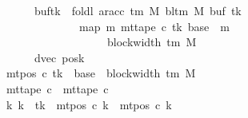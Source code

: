 \begin{isabellebody}
\ \ \ \ \ \ \ \ \ \ \ \ \ \ \ \ \ \ \ \ buf{}{\isacharparenleft}{\kern0pt}tk\ {\isacharcolon}{\kern0pt}{\isacharequal}{\kern0pt}\ foldl\ {\isacharparenleft}{\kern0pt}ar{\isacharunderscore}{\kern0pt}acc\ {\isacharparenleft}{\kern0pt}{\isasymGamma}{\isacharunderscore}{\kern0pt}tm\ M{\isacharparenright}{\kern0pt}\ {\isacharparenleft}{\kern0pt}bl{\isacharunderscore}{\kern0pt}tm\ M{\isacharparenright}{\kern0pt}{\isacharparenright}{\kern0pt}\ {\isacharparenleft}{\kern0pt}buf{}\ tk{\isacharparenright}{\kern0pt}\isanewline
\ \ \ \ \ \ \ \ \ \ \ \ \ \ \ \ \ \ \ \ \ \ \ \ \ \ \ \ {\isacharparenleft}{\kern0pt}map\ {\isacharparenleft}{\kern0pt}{\isasymlambda}m{\isachardot}{\kern0pt}\ mt{\isacharunderscore}{\kern0pt}tape\ c{\isacharprime}{\kern0pt}\ tk\ {\isacharparenleft}{\kern0pt}base\ {\isacharplus}{\kern0pt}\ m{\isacharparenright}{\kern0pt}{\isacharparenright}{\kern0pt}\isanewline
\ \ \ \ \ \ \ \ \ \ \ \ \ \ \ \ \ \ \ \ \ \ \ \ \ \ \ \ \ \ \ \ \ {\isacharbrackleft}{\kern0pt}{}{\isachardot}{\kern0pt}{\isachardot}{\kern0pt}{\isacharless}{\kern0pt}block{\isacharunderscore}{\kern0pt}width\ {\isacharparenleft}{\kern0pt}{\isasymGamma}{\isacharunderscore}{\kern0pt}tm\ M{\isacharparenright}{\kern0pt}\ {\isacharminus}{\kern0pt}\ {}{\isacharbrackright}{\kern0pt}{\isacharparenright}{\kern0pt}{\isacharparenright}{\kern0pt}{\isacharcomma}{\kern0pt}\isanewline
\ \ \ \ \ \ \ \ \ \ \ \ \ \ \ \ \ \ \ \ dvec{\isacharcomma}{\kern0pt}\ posk{\isacharparenright}{\kern0pt}\isanewline
\ \ \ \ \ \ \ \ \ \ \ \ \ \ {\isasymand}\ mt{\isacharunderscore}{\kern0pt}pos\ c{\isacharprime}{\kern0pt}{\isacharprime}{\kern0pt}\ tk\ {\isacharequal}{\kern0pt}\ base\ {\isacharplus}{\kern0pt}\ {\isacharparenleft}{\kern0pt}block{\isacharunderscore}{\kern0pt}width\ {\isacharparenleft}{\kern0pt}{\isasymGamma}{\isacharunderscore}{\kern0pt}tm\ M{\isacharparenright}{\kern0pt}\ {\isacharminus}{\kern0pt}\ {}{\isacharparenright}{\kern0pt}\isanewline
\ \ \ \ \ \ \ \ \ \ \ \ \ \ {\isasymand}\ mt{\isacharunderscore}{\kern0pt}tape\ c{\isacharprime}{\kern0pt}{\isacharprime}{\kern0pt}\ {\isacharequal}{\kern0pt}\ mt{\isacharunderscore}{\kern0pt}tape\ c{\isacharprime}{\kern0pt}\isanewline
\ \ \ \ \ \ \ \ \ \ \ \ \ \ {\isasymand}\ {\isacharparenleft}{\kern0pt}{\isasymforall}k{\isacharprime}{\kern0pt}{\isachardot}{\kern0pt}\ k{\isacharprime}{\kern0pt}\ {\isasymnoteq}\ tk\ {\isasymlongrightarrow}\ mt{\isacharunderscore}{\kern0pt}pos\ c{\isacharprime}{\kern0pt}{\isacharprime}{\kern0pt}\ k{\isacharprime}{\kern0pt}\ {\isacharequal}{\kern0pt}\ mt{\isacharunderscore}{\kern0pt}pos\ c{\isacharprime}{\kern0pt}\ k{\isacharprime}{\kern0pt}{\isacharparenright}{\kern0pt}{\isachardoublequoteclose}\isanewline

\end{isabellebody}
